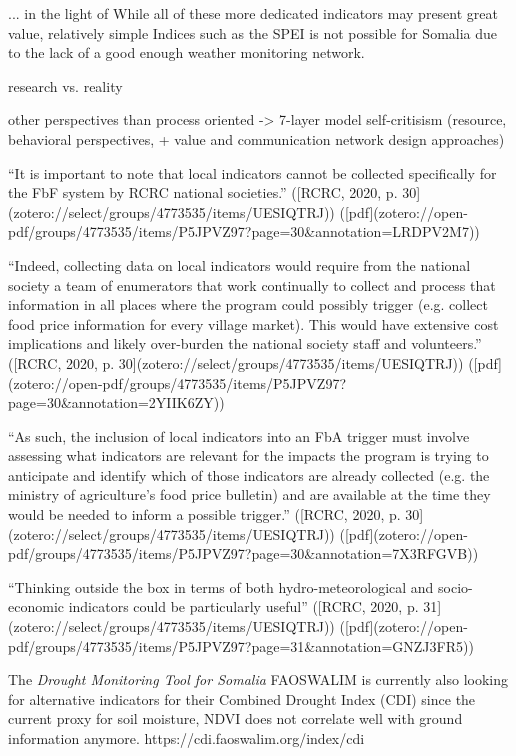 ... in the light of
While all of these more dedicated indicators may present great value, relatively simple Indices such as the SPEI is not possible for Somalia due to the lack of a good enough weather monitoring network. 



research vs. reality

other perspectives than process oriented -> 7-layer model self-critisism (resource, behavioral perspectives, + value and communication network design approaches)

“It is important to note that local indicators cannot be collected specifically for the FbF system by RCRC national societies.” ([RCRC, 2020, p. 30](zotero://select/groups/4773535/items/UESIQTRJ)) ([pdf](zotero://open-pdf/groups/4773535/items/P5JPVZ97?page=30&annotation=LRDPV2M7))

“Indeed, collecting data on local indicators would require from the national society a team of enumerators that work continually to collect and process that information in all places where the program could possibly trigger (e.g. collect food price information for every village market). This would have extensive cost implications and likely over-burden the national society staff and volunteers.” ([RCRC, 2020, p. 30](zotero://select/groups/4773535/items/UESIQTRJ)) ([pdf](zotero://open-pdf/groups/4773535/items/P5JPVZ97?page=30&annotation=2YIIK6ZY))

“As such, the inclusion of local indicators into an FbA trigger must involve assessing what indicators are relevant for the impacts the program is trying to anticipate and identify which of those indicators are already collected (e.g. the ministry of agriculture's food price bulletin) and are available at the time they would be needed to inform a possible trigger.” ([RCRC, 2020, p. 30](zotero://select/groups/4773535/items/UESIQTRJ)) ([pdf](zotero://open-pdf/groups/4773535/items/P5JPVZ97?page=30&annotation=7X3RFGVB))

“Thinking outside the box in terms of both hydro-meteorological and socio-economic indicators could be particularly useful” ([RCRC, 2020, p. 31](zotero://select/groups/4773535/items/UESIQTRJ)) ([pdf](zotero://open-pdf/groups/4773535/items/P5JPVZ97?page=31&annotation=GNZJ3FR5))


The \textit{Drought Monitoring Tool for Somalia} FAOSWALIM is currently also looking for alternative indicators for their Combined Drought Index (CDI) since the current proxy for soil moisture, NDVI does not correlate well with ground information anymore.  https://cdi.faoswalim.org/index/cdi

